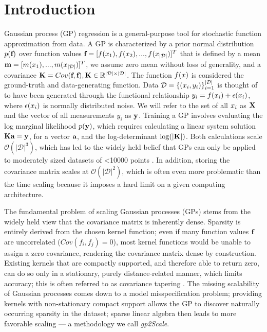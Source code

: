 \documentclass{article}
\renewcommand{\mathbf}[1]{%
  \ifx#1x x\else \textbf{#1}\fi
}
\begin{document}
\section{Introduction}
Gaussian process (GP) regression is a general-purpose tool for stochastic function approximation from data. A GP is characterized by a prior normal distribution $p(\mathbf{f})$ over function values $\mathbf{f}=[f(\mathbf{x}_1), f(\mathbf{x}_2),...,f(\mathbf{x}_{|\mathcal{D}|})]^T$ that is defined by a mean $\mathbf{m}=[m(\mathbf{x}_1),...,m(\mathbf{x}_{|\mathcal{D}|})]^T$, we assume zero mean without loss of generality, and a covariance $\mathbf{K}=Cov(\mathbf{f},\mathbf{f}), \mathbf{K} \in \mathbb{R}^{|\mathcal{D}| \times |\mathcal{D}|}$. The function $f(\mathbf{x})$ is considered the ground-truth and data-generating function. Data $\mathcal{D}=\{(\mathbf{x}_i, y_i)\}_{i=1}^{|\mathcal{D}|}$ is thought of to have been generated through the functional relationship $y_i=f(\mathbf{x}_i) + \epsilon(\mathbf{x}_i)$, where $\epsilon(\mathbf{x}_i)$ is normally distributed noise. We will refer to the set of all $\mathbf{x}_i$ as $\mathbf{X}$ and the vector of all measurements $y_i$ as $\mathbf{y}$. Training a GP involves evaluating the log marginal likelihood $p(\mathbf{y})$, which requires calculating a linear system solution $\mathbf{K} \mathbf{a}=\mathbf{y}$, for a vector $\mathbf{a}$, and the log-determinant $\log(|\mathbf{K}|)$. Both calculations scale $\mathcal{O}(|\mathcal{D}|^3)$, which has led to the widely held belief that GPs can only be applied to moderately sized datasets of <10000 points \citep{williams2006gaussian}. In addition, storing the covariance matrix scales at $\mathcal{O}(|\mathcal{D}|^2)$, which is often even more problematic than the time scaling because it imposes a hard limit on a given computing architecture. 

The fundamental problem of scaling Gaussian processes (GPs) stems from the widely held view that the covariance matrix is inherently dense. Sparsity is entirely derived from the chosen kernel function; even if many function values $\mathbf{f}$ are uncorrelated ($Cov(f_i,f_j)=0$), most kernel functions would be unable to assign a zero covariance, rendering the covariance matrix dense by construction. Existing kernels that are compactly supported, and therefore able to return zero, can do so only in a stationary, purely distance-related manner, which limits accuracy; this is often referred to as covariance tapering \citep{Furrer2006, Kaufman2008}. The missing scalability of Gaussian processes comes down to a model misspecification problem; providing kernels with non-stationary compact support allows the GP to discover naturally occurring sparsity in the dataset; sparse linear algebra then leads to more favorable scaling --- a methodology we call \emph{gp2Scale}.
\end{document}
